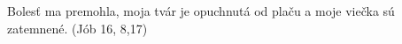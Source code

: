 Bolesť ma premohla, moja tvár je opuchnutá od plaču 
a moje viečka \newline
sú zatemnené. (Jób 16, 8,17)
